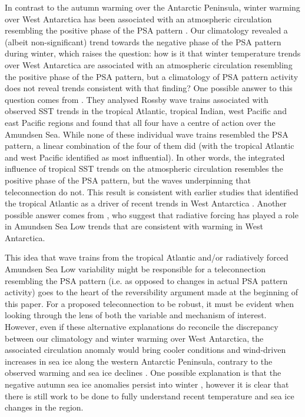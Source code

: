 In contrast to the autumn warming over the Antarctic Peninsula, winter warming over West Antarctica has been associated with an atmospheric circulation resembling the positive phase of the PSA pattern \citep{Ding2011}. Our climatology revealed a (albeit non-significant) trend towards the negative phase of the PSA pattern during winter, which raises the question: how is it that winter temperature trends over West Antarctica are associated with an atmospheric circulation resembling the positive phase of the PSA pattern, but a climatology of PSA pattern activity does not reveal trends consistent with that finding? One possible answer to this question comes from \citet{Li2015a}. They analysed Rossby wave trains associated with observed SST trends in the tropical Atlantic, tropical Indian, west Pacific and east Pacific regions and found that all four have a centre of action over the Amundsen Sea. While none of these individual wave trains resembled the PSA pattern, a linear combination of the four of them did (with the tropical Atlantic and west Pacific identified as most influential). In other words, the integrated influence of tropical SST trends on the atmospheric circulation resembles the positive phase of the PSA pattern, but the waves underpinning that teleconnection do not. This result is consistent with earlier studies that identified the tropical Atlantic as a driver of recent trends in West Antarctica \citep{Li2014,Simpkins2014}. Another possible answer comes from \citet{Fogt2015}, who suggest that radiative forcing has played a role in Amundsen Sea Low trends that are consistent with warming in West Antarctica. 

This idea that wave trains from the tropical Atlantic and/or radiatively forced Amundsen Sea Low variability might be responsible for a teleconnection resembling the PSA pattern (i.e. as opposed to changes in actual PSA pattern activity) goes to the heart of the reversibility argument made at the beginning of this paper. For a proposed teleconnection to be robust, it must be evident when looking through the lens of both the variable and mechanism of interest. However, even if these alternative explanations do reconcile the discrepancy between our climatology and winter warming over West Antarctica, the associated circulation anomaly would bring cooler conditions and wind-driven increases in sea ice along the western Antarctic Peninsula, contrary to the observed warming and sea ice declines \citep{Clem2015}. One possible explanation is that the negative autumn sea ice anomalies persist into winter \citep{Ding2013}, however it is clear that there is still work to be done to fully understand recent temperature and sea ice changes in the region.

